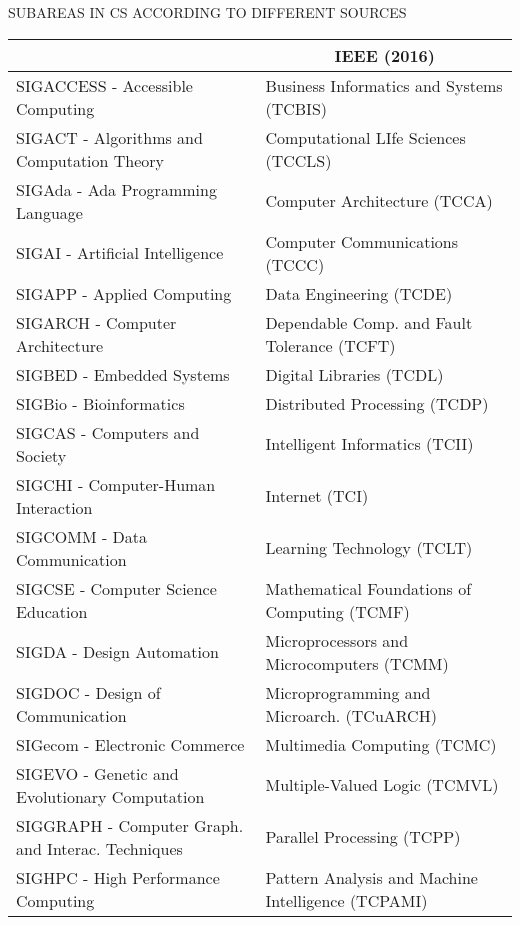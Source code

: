 SUBAREAS IN CS ACCORDING TO DIFFERENT SOURCES							

\begin{table}[htbp]
\centering
\begin{tabular}{ll}
\scriptsize
\toprule
\multicolumn{1}{c}{ACM SIG's (2016)}						&	\multicolumn{1}{c}{IEEE (2016)}							\\								
\midrule
SIGACCESS - Accessible Computing							&	Business Informatics and Systems (TCBIS)				\\
SIGACT - Algorithms and Computation Theory					&	Computational LIfe Sciences (TCCLS)						\\
SIGAda - Ada Programming Language							&	Computer Architecture (TCCA)							\\
SIGAI - Artificial Intelligence								&	Computer Communications (TCCC)							\\
SIGAPP - Applied Computing									&	Data Engineering (TCDE)									\\
SIGARCH - Computer Architecture								&	Dependable Comp. and Fault Tolerance (TCFT)				\\
SIGBED - Embedded Systems									&	Digital Libraries (TCDL)								\\
SIGBio - Bioinformatics										&	Distributed Processing (TCDP)							\\
SIGCAS - Computers and Society								&	Intelligent Informatics (TCII)							\\
SIGCHI - Computer-Human Interaction							&	Internet (TCI)											\\
SIGCOMM - Data Communication								&	Learning Technology (TCLT)								\\
SIGCSE - Computer Science Education							&	Mathematical Foundations of Computing (TCMF)			\\
SIGDA - Design Automation									&	Microprocessors and Microcomputers (TCMM)				\\
SIGDOC - Design of Communication							&	Microprogramming and Microarch. (TCuARCH)				\\
SIGecom - Electronic Commerce								&	Multimedia Computing (TCMC)								\\
SIGEVO - Genetic and Evolutionary Computation				&	Multiple-Valued Logic (TCMVL)							\\
SIGGRAPH - Computer Graph. and Interac. Techniques			&	Parallel Processing (TCPP)								\\
SIGHPC - High Performance Computing							&	Pattern Analysis and Machine Intelligence (TCPAMI)		\\

\end{tabular}
\end{table}
